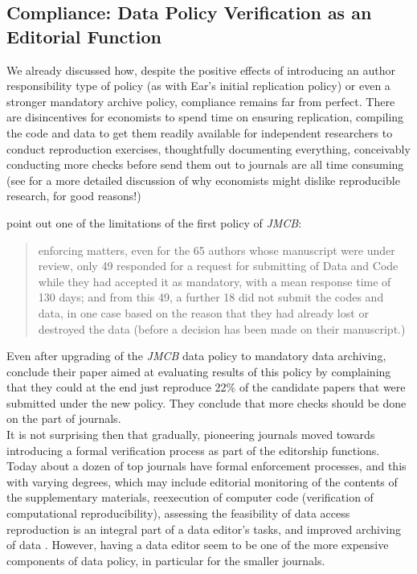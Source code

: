 \documentclass[11pt]{article}
\begin{document}
\subsection{Compliance: Data Policy Verification as an Editorial Function}
We already discussed how, despite the positive effects of introducing an author responsibility type of policy (as with Ear's initial replication policy) or even a stronger mandatory archive policy,
compliance remains far from perfect. There are disincentives for economists to spend time on ensuring replication, compiling the code and data to get them readily available for independent researchers to conduct reproduction exercises, thoughtfully documenting everything, conceivably conducting more checks before send them out to journals are all time consuming (see \cite{feigenbaum1993market} for a more detailed discussion of why economists might dislike reproducible research, for good reasons!)

\cite{dewald1986replication} point out one of the limitations of the first policy of \textit{JMCB}:
\begin{quotation}
enforcing matters, even for the 65 authors whose manuscript were under review, only 49 responded for a request for submitting of Data and Code while they had accepted it as mandatory, with a mean response time of 130 days; and from this 49, a further 18 did not submit the codes and data, in one case based on the reason that they had already lost or destroyed the data (before a decision has been made on their manuscript.)
\end{quotation}

Even after upgrading of the \textit{JMCB} data policy to mandatory data archiving, \cite{mccullough2006lessons} conclude their paper aimed at evaluating results of this policy by complaining that they could at the end just reproduce 22\% of the candidate papers that were submitted under the new policy. They conclude that more checks should be done on the part of journals.\\

It is not surprising then that gradually, pioneering journals moved towards introducing a formal verification process as part of the editorship functions. Today about a dozen of top journals have formal enforcement processes, and this with varying degrees, which may include editorial monitoring of the contents of the supplementary materials, reexecution of
computer code (verification of computational reproducibility), assessing the feasibility of data access reproduction is an integral part of a data editor's tasks, and improved archiving of data \cite{vilhuber2020reproducibility}. However, having a data editor seem to be one of the more expensive components of data policy, in particular for the smaller journals.\\
\end{document}
